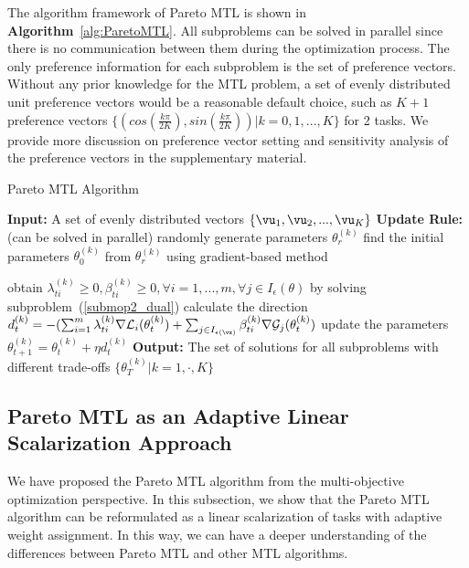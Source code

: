 The algorithm framework of Pareto MTL is shown in \textbf{Algorithm}~\ref{alg:ParetoMTL}. All subproblems can be solved in parallel since there is no communication between them during the optimization process. The only preference information for each subproblem is the set of preference vectors. Without any prior knowledge for the MTL problem, a set of evenly distributed unit preference vectors would be a reasonable default choice, such as $K+1$ preference vectors $\{(cos(\frac{k\pi}{2K}),sin(\frac{k\pi}{2K}))| k = 0,1,...,K\}$ for 2 tasks. We provide more discussion on preference vector setting and sensitivity analysis of the preference vectors in the supplementary material.

\clearpage

\begin{algorithm}[H]
	\caption{Pareto MTL Algorithm}
	\label{alg:ParetoMTL}
	\begin{algorithmic}[1]
		
		\STATE \textbf{Input:} A set of evenly distributed vectors $\{\vu_1,\vu_2,...,\vu_K\}$
		\STATE \textbf{Update Rule:}
		\STATE (can be solved in parallel)
		    \STATE randomly generate parameters $\theta_r^{(k)}$
		    \STATE find the initial parameters $\theta_0^{(k)}$ from $\theta_r^{(k)}$ using gradient-based method
    	
        		
        		\STATE obtain $\lambda_{ti}^{(k)} \geq 0, \beta_{ti}^{(k)} \geq 0, \forall i = 1,...,m, \forall j \in I_{\epsilon}(\theta)$ by solving subproblem~(\ref{submop2_dual})
        		\STATE calculate the direction $d_t^{(k)} = - (\sum_{i=1}^{m} \lambda_{ti}^{(k)} \nabla \mathcal{L}_i(\theta^{(k)}_{t}) +  \sum_{j \in I_{\epsilon(\vx)}} \beta_{ti}^{(k)} \nabla \mathcal{G}_j(\theta^{(k)}_{t})$
        		\STATE update the parameters $\theta^{(k)}_{t + 1} = \theta^{(k)}_{t} + \eta d_t^{(k)}$
    		\ENDFOR
		\ENDFOR	
		\STATE \textbf{Output:} The set of solutions for all subproblems with different trade-offs  $\{\theta^{(k)}_{T}| k = 1,\cdot,K\} $
		
	\end{algorithmic}
\end{algorithm}

\subsection{Pareto MTL as an Adaptive Linear Scalarization Approach}

We have proposed the Pareto MTL algorithm from the multi-objective optimization perspective. In this subsection, we show that the Pareto MTL algorithm can be reformulated as a linear scalarization of tasks with adaptive weight assignment. In this way, we can have a deeper understanding of the differences between Pareto MTL and other MTL algorithms.


